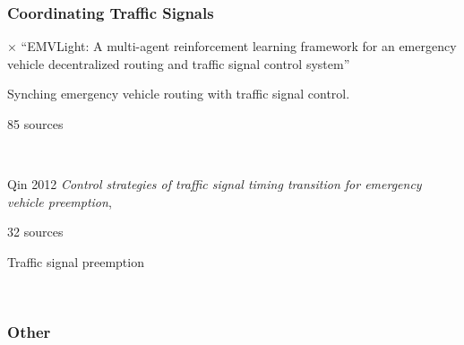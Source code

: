 \subsubsection{Coordinating Traffic Signals}

$\times $ \quad \cite{SU2023103955}
``EMVLight: A multi-agent reinforcement learning framework for an emergency vehicle decentralized routing and traffic signal control system''

Synching emergency vehicle routing with traffic signal control.

85 sources

\

\cite{QIN20121} Qin 2012
{\it Control strategies of traffic signal timing transition for emergency vehicle preemption},

32 sources

Traffic signal preemption

\



\subsubsection{Other}

\begin{comment}

Annals of Emergency Medicine
Annals of Operations Research
Computer Operations Research
Computers and Operational Research
European Journal of Operational Research
IEEE Transactions on Intelligent Transportation Systems
INFORMS Journal on Computation
INFORMS Journal on Computing
International Journal of Operational Research
Journal of Algorithms
Journal of Operations Research, 
Journal of Transportation Engineering
Management Science
Mathematical Programming
Operations Research
Operations Research for Health Care
Transportation Research Record
Transportation Science
TRpA
TRpB
TRpC
TRpE
\end{comment}

